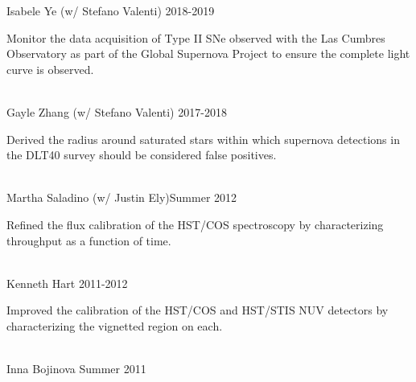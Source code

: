\documentclass[10pt]{cv}
\begin{document}
\begin{llist}
\vspace{-0.1in}  
Isabele Ye (w/ Stefano Valenti) \hfill 2018-2019\\
\begin{minipage}[l]{0.7\textwidth}\vspace{0.15cm}
Monitor the data acquisition of Type II SNe observed with the Las Cumbres Observatory as part of the Global Supernova Project to ensure the complete light curve is observed.\\
\end{minipage}\vspace{0.15cm}
\\
Gayle Zhang (w/ Stefano Valenti) \hfill 2017-2018\\
\begin{minipage}[l]{0.7\textwidth}\vspace{0.15cm}
Derived the radius around saturated stars within which supernova detections in the DLT40 survey should be considered false positives.\\
\end{minipage}\vspace{0.15cm}
\\
Martha Saladino (w/ Justin Ely)\hfill Summer 2012\\
\begin{minipage}[l]{0.7\textwidth}\vspace{0.15cm}
Refined the flux calibration of the HST/COS spectroscopy by characterizing throughput as a function of time.\\
\end{minipage}\vspace{0.15cm}
\\
Kenneth Hart \hfill 2011-2012\\
\begin{minipage}[l]{0.7\textwidth}\vspace{0.15cm}
Improved the calibration of the HST/COS and HST/STIS NUV detectors by characterizing the vignetted region on each.\\
\end{minipage}\vspace{0.15cm}
\\
Inna Bojinova \hfill Summer 2011\\
\begin{minipage}[l]{0.7\textwidth}\vspace{0.15cm}

\end{minipage}
\end{llist}
\end{document}
